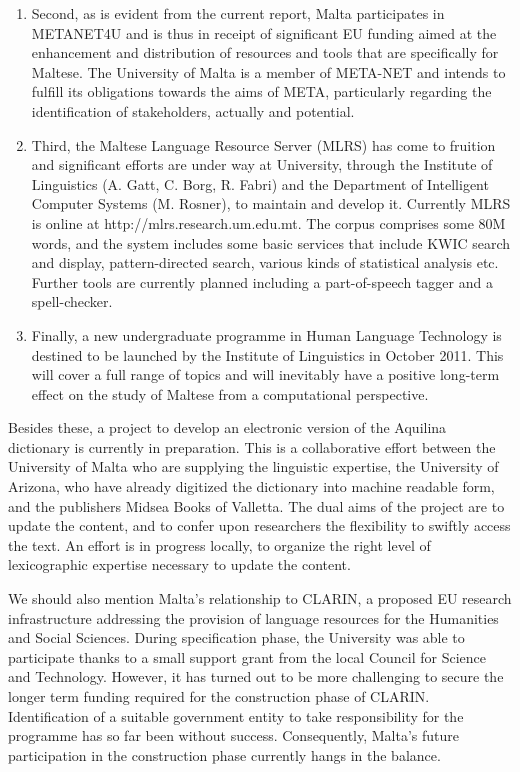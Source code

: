 \documentclass[]{../../metanetpaper}
\begin{document}
\begin{multicols}{2}
\begin{enumerate}
\item Second, as is evident from the current report, Malta participates in METANET4U and is thus in receipt of significant EU funding aimed at the enhancement and distribution of resources and tools that are specifically for Maltese. The University of Malta is a member of META-NET and intends to fulfill its obligations towards the aims of META, particularly regarding the identification of stakeholders, actually and potential. 

\item Third, the Maltese Language Resource Server (MLRS) has come to fruition and significant efforts are under way at University, through the Institute of Linguistics (A. Gatt, C. Borg, R. Fabri) and the Department of Intelligent Computer Systems (M. Rosner), to maintain and develop it. Currently MLRS is online at http://mlrs.research.um.edu.mt. The corpus comprises some 80M words, and the system includes some basic services that include KWIC search and display, pattern-directed search, various kinds of statistical analysis etc. Further tools are currently planned including a part-of-speech tagger and a spell-checker.

\item Finally, a new undergraduate programme in Human Language Technology is destined to be launched by the Institute of Linguistics in October 2011. This will cover a full range of topics and will inevitably have a positive long-term effect on the study of Maltese from a computational perspective.
\end{enumerate}

Besides these, a project to develop an electronic version of the Aquilina dictionary \cite{Aquilina:1987} is currently in preparation. This is a collaborative effort between the University of Malta who are supplying the linguistic expertise, the University of Arizona, who have already digitized the dictionary into machine readable form, and the publishers Midsea Books of Valletta. The dual aims of the project are to update the content, and to confer upon researchers the flexibility to swiftly access the text. An effort is in progress locally, to organize the right level of lexicographic expertise necessary to update the content.

We should also mention Malta’s relationship to CLARIN, a proposed EU research infrastructure addressing the provision of language resources for the Humanities and Social Sciences. During specification phase, the University was able to participate thanks to a small support grant from the local Council for Science and Technology. However, it has turned out to be more challenging to secure the longer term funding required for the construction phase of CLARIN. Identification of a suitable government entity to take responsibility for the programme has so far been without success. Consequently, Malta’s future participation in the construction phase currently hangs in the balance.
  

\end{multicols}
\end{document}
